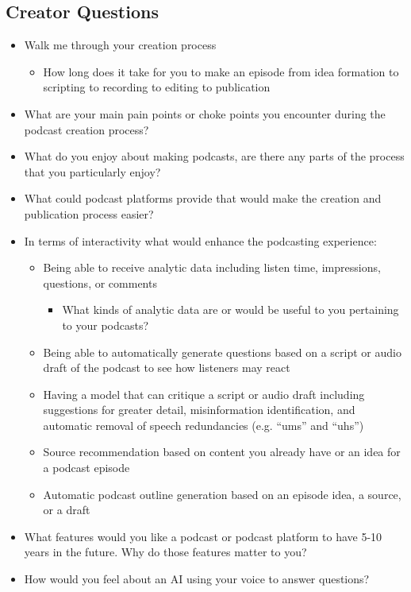 \documentclass[12pt]{report}
\begin{document}
\begin{myfont}
        \section{Creator Questions}
        \begin{itemize}
          \item Walk me through your creation process
          \begin{itemize}
            \item How long does it take for you to make an episode from idea formation to scripting to recording to editing to publication
          \end{itemize}
          \item What are your main pain points or choke points you encounter during the podcast creation process?
          \item What do you enjoy about making podcasts, are there any parts of the process that you particularly enjoy?
          \item What could podcast platforms provide that would make the creation and publication process easier?
          \item In terms of interactivity what would enhance the podcasting experience:
          \begin{itemize}
            \item Being able to receive analytic data including listen time, impressions, questions, or comments
            \begin{itemize}
              \item What kinds of analytic data are or would be useful to you pertaining to your podcasts?
            \end{itemize}
            \item Being able to automatically generate questions based on a script or audio draft of the podcast to see how listeners may react
            \item Having a model that can critique a script or audio draft including suggestions for greater detail, misinformation identification, and automatic removal of speech redundancies (e.g. “ums” and “uhs”)
            \item Source recommendation based on content you already have or an idea for a podcast episode
            \item Automatic podcast outline generation based on an episode idea, a source, or a draft
          \end{itemize}
          \item What features would you like a podcast or podcast platform to have 5-10 years in the future. Why do those features matter to you?
          \item How would you feel about an AI using your voice to answer questions?
        \end{itemize}
        

\end{myfont}
\end{document}

